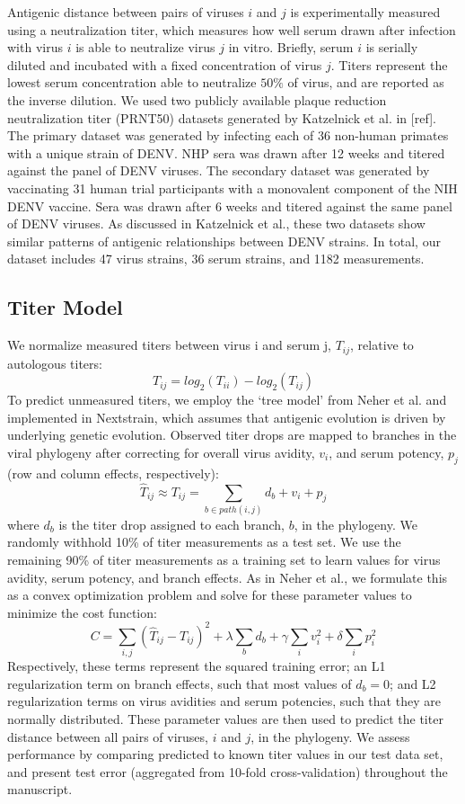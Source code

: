 \documentclass[11pt,oneside,letterpaper]{article}
\begin{document}
Antigenic distance between pairs of viruses $i$ and $j$ is experimentally measured using a neutralization titer, which measures how well serum drawn after infection with virus $i$ is able to neutralize virus $j$ in vitro.
Briefly, serum $i$ is serially diluted and incubated with a fixed concentration of virus $j$.
Titers represent the lowest serum concentration able to neutralize $50\%$ of virus, and are reported as the inverse dilution.
We used two publicly available plaque reduction neutralization titer (PRNT50) datasets generated by Katzelnick et al. in {[}ref{]}.
The primary dataset was generated by infecting each of 36 non-human primates with a unique strain of DENV.
NHP sera was drawn after 12 weeks and titered against the panel of DENV viruses.
The secondary dataset was generated by vaccinating 31 human trial participants with a monovalent component of the NIH DENV vaccine.
Sera was drawn after 6 weeks and titered against the same panel of DENV viruses.
As discussed in Katzelnick et al., these two datasets show similar patterns of antigenic relationships between DENV strains.
In total, our dataset includes 47 virus strains, 36 serum strains, and 1182 measurements.

\subsection*{Titer Model}
We normalize measured titers between virus i and serum j, $T_{ij}$, relative to autologous titers: $$T_{ij} = log_2(T_{ii}) - log_2(T_{ij})$$
To predict unmeasured titers, we employ the `tree model' from Neher et al. and implemented in Nextstrain, which assumes that antigenic evolution is driven by underlying genetic evolution.
Observed titer drops are mapped to branches in the viral phylogeny after correcting for overall virus avidity, $v_i$, and serum potency, $p_j$ (row and column effects, respectively):
$$\hat{T}_{ij} \approx T_{ij} = \sum_{b \in path(i,j)} d_b + v_i + p_j$$
where $d_b$ is the titer drop assigned to each branch, $b$, in the phylogeny.
We randomly withhold 10\% of titer measurements as a test set.
We use the remaining 90\% of titer measurements as a training set to learn values for virus avidity, serum potency, and branch effects.
As in Neher et al., we formulate this as a convex optimization problem and solve for these parameter values to minimize the cost function:
$$C = \sum_{i,j} (\hat{T}_{ij} - T_{ij})^2 + \lambda \sum_{b} d_b + \gamma \sum_{i} v_i^2 + \delta \sum_{i} p_i^2$$
Respectively, these terms represent the squared training error; an L1 regularization term on branch effects, such that most values of $d_b = 0$; and L2 regularization terms on virus avidities and serum potencies, such that they are normally distributed.
These parameter values are then used to predict the titer distance between all pairs of viruses, $i$ and $j$, in the phylogeny.
We assess performance by comparing predicted to known titer values in our test data set, and present test error (aggregated from 10-fold cross-validation) throughout the manuscript.
\end{document}
